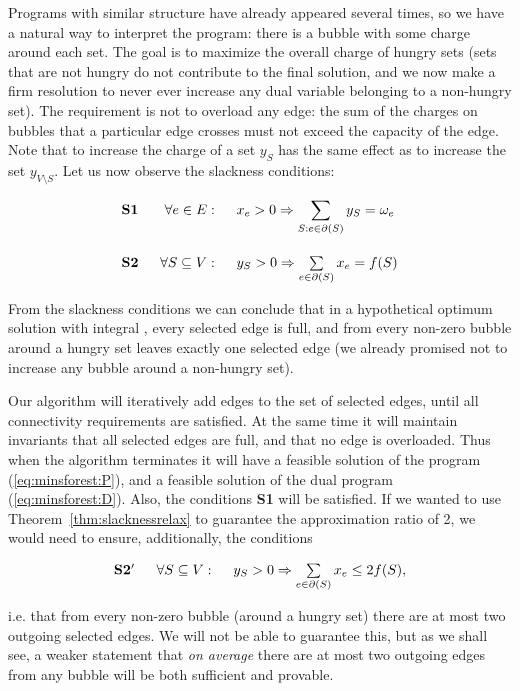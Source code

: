 \noindent
Programs with similar structure have already appeared several times, so we have a natural way to interpret
the program: there is a bubble with some charge around each set. The goal is to maximize the overall charge
of hungry sets (sets that are not hungry do not contribute to the final solution, and we now make a firm resolution
to never ever increase any dual variable belonging to a non-hungry set). The requirement is not to overload
any edge: the sum of the charges on bubbles that a particular edge crosses must not exceed the capacity
of the edge. Note that to increase the charge of a set $y_S$ has the same effect as to increase 
the set $y_{V\setminus S}$. Let us now observe the slackness conditions:


$$\begin{array}{lrl}
  {\bf S1} \;\;&\forall e\in E:\;\;&x_e>0\Rightarrow
  \displaystyle\sum\limits_{S:e\in\partial(S)}y_S=\omega_e\\[6ex]
  {\bf S2} \;\;&\forall S\subseteq V:\;\; & y_S>0\Rightarrow \sum\limits_{e\in\partial(S)}x_e=f(S)
\end{array}$$

\noindent
From the slackness conditions we can conclude that in a hypothetical optimum solution with integral ,
every selected edge is full, and from every non-zero bubble around a hungry set
leaves exactly one selected edge (we already promised not to increase any bubble around a non-hungry set).

\noindent
Our algorithm will iteratively add edges to the set of selected edges, until all connectivity requirements
are satisfied. At the same time it will maintain invariants that all selected edges are full, and that 
no edge is overloaded. Thus when the algorithm terminates it will have a feasible solution of 
the program (\ref{eq:minsforest:P}), and a feasible solution of the dual program (\ref{eq:minsforest:D}).
Also, the conditions {\bf S1} will be satisfied. If we wanted to use Theorem~\ref{thm:slacknessrelax}
to guarantee the approximation ratio of 2, we would need to ensure, additionally, the conditions

$$\begin{array}{lrl}
  {\bf S2'} \;\;&\forall S\subseteq V:\;\; & y_S>0\Rightarrow \sum\limits_{e\in\partial(S)}x_e\le2f(S),
\end{array}$$

\noindent 
i.e. that from every non-zero bubble (around a hungry set) there are at most two outgoing selected edges.
We will not be able to guarantee this, but as we shall see, a weaker statement that {\em on average}
there are at most two outgoing edges from any bubble will be both sufficient and provable.


